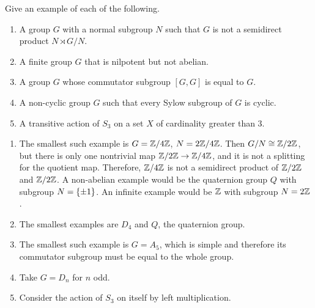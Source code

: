 %
\begin{question}[subtitle = January 2017 Problem 1,ID=Jan17_1]
Give an example of each of the following.
\begin{enumerate}
    \item A group $G$ with a normal subgroup $N$ such that $G$ is not a semidirect product $N \rtimes G/N$.
    \item A finite group $G$ that is nilpotent but not abelian.
    \item A group $G$ whose commutator subgroup $[G,G]$ is equal to $G$.
    \item A non-cyclic group $G$ such that every Sylow subgroup of $G$ is cyclic.
    \item A transitive action of $S_3$ on a set $X$ of cardinality greater than 3.
\end{enumerate}
\end{question}
\begin{solution}
\begin{enumerate}
    \item The smallest such example is $G = \mathbb{Z}/4\mathbb{Z}$, $N = 2\mathbb{Z}/4\mathbb{Z}$. Then $G/N \cong \mathbb{Z}/2\mathbb{Z}$, but there is only one nontrivial map $\mathbb{Z}/2\mathbb{Z} \to \mathbb{Z}/4\mathbb{Z}$, and it is not a splitting for the quotient map. Therefore, $\mathbb{Z}/4\mathbb{Z}$ is not a semidirect product of $\mathbb{Z}/2\mathbb{Z}$ and $\mathbb{Z}/2\mathbb{Z}$. A non-abelian example would be the quaternion group $Q$ with subgroup $N = \{\pm 1\}$. An infinite example would be $\mathbb{Z}$ with subgroup $N = 2\mathbb{Z}$.
    \item The smallest examples are $D_4$ and $Q$, the quaternion group.
    \item The smallest such example is $G = A_5$, which is simple and therefore its commutator subgroup must be equal to the whole group.
    \item Take $G = D_n$ for $n$ odd.
    \item Consider the action of $S_3$ on itself by left multiplication.
\end{enumerate}
\end{solution}

